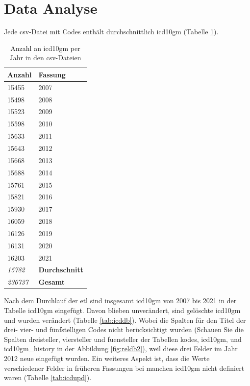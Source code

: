 
\section{Data Analyse} \label{dataanalysis}

Jede \ac{csv}-Datei mit Codes enthält durchschnittlich {} \ac{icd10gm} (Tabelle \ref{tab:icdfiles}).

\begin{table}[ht]
	\centering
	\small
	\caption[\acs{icd10gm} in den \acs{csv}-Dateien]{Anzahl an \acs{icd10gm} per Jahr in den \ac{csv}-Dateien}
	\label{tab:icdfiles}
	\begin{tabular}{|l|l|}
		\hline
	\rowcolor{lightgray}	Anzahl & Fassung \\ \hline 
		15455 & 2007 \\ \hline
		15498 & 2008 \\ \hline
		15523 & 2009 \\ \hline
		15598 & 2010 \\ \hline
		15633 & 2011 \\ \hline
		15643 & 2012 \\ \hline
		15668 & 2013 \\ \hline
		15688 & 2014 \\ \hline
		15761 & 2015 \\ \hline
		15821 & 2016 \\ \hline
		15930 & 2017 \\ \hline
		16059 & 2018 \\ \hline
		16126 & 2019 \\ \hline
		16131 & 2020 \\ \hline
		16203 & 2021 \\ \hline
		\hline
		\textit{15782} & \textbf{Durchschnitt} \\ \hline
		\textit{236737} & \textbf{Gesamt} \\ \hline
	\end{tabular}
	\end{table}

Nach dem Durchlauf der \ac{etl} sind insgesamt {} \ac{icd10gm} von 2007 bis 2021 in der Tabelle {\ttfamily icd10gm} eingefügt. Davon {} blieben unverändert,{} sind gelöschte \ac{icd10gm} und {} wurden verändert (Tabelle \ref{tab:icddb}). Wobei die Spalten für den Titel der drei- vier- und fünfstelligen Codes nicht berücksichtigt wurden (Schauen Sie die Spalten {\ttfamily dreisteller}, {\ttfamily viersteller} und {\ttfamily fuensteller} der Tabellen {\ttfamily kodes}, {\ttfamily icd10gm}, und {\ttfamily icd10gm\_history} in der Abbildung \ref{fig:reldb2}), weil diese drei Felder im Jahr 2012 neue eingefügt wurden. Ein weiteres Aspekt ist, dass die Werte verschiedener Felder in früheren Fassungen bei manchen \ac{icd10gm} nicht definiert waren (Tabelle \ref{tab:icdupd}).

